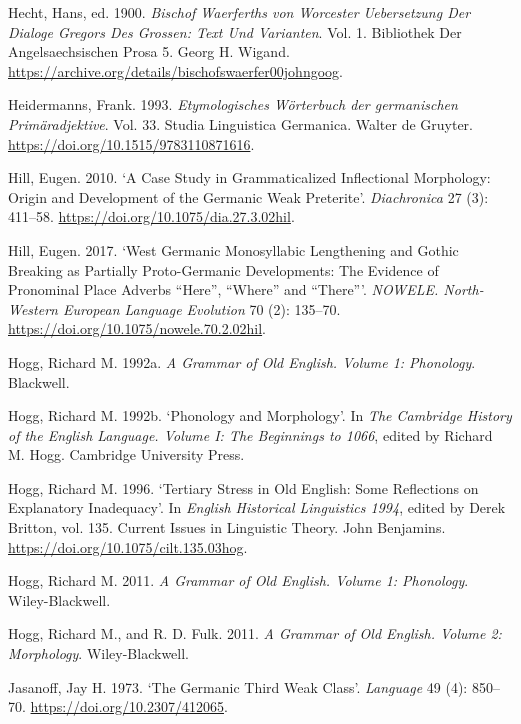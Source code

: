 \documentclass[
  british,
  a4paper,
]{article}
\newlength{\cslhangindent}
\newenvironment{CSLReferences}[2] %
 {\begin{list}{}{%
  \setlength{\itemindent}{0pt}
  \setlength{\leftmargin}{0pt}
  \setlength{\parsep}{0pt}
  \ifodd #1
   \setlength{\leftmargin}{\cslhangindent}
   \setlength{\itemindent}{-1\cslhangindent}
  \fi
  \setlength{\itemsep}{#2\baselineskip}}}
 {\end{list}}
\begin{document}
\begin{CSLReferences}{1}{1}
Hecht, Hans, ed. 1900. \emph{Bischof Waerferths von Worcester
{Uebersetzung} Der {Dialoge} {Gregors} Des {Grossen}: Text Und
Varianten}. Vol. 1. Bibliothek Der Angelsaechsischen Prosa 5. Georg H.
Wigand. \url{https://archive.org/details/bischofswaerfer00johngoog}.

Heidermanns, Frank. 1993. \emph{{Etymologisches Wörterbuch der
germanischen Primäradjektive}}. Vol. 33. Studia Linguistica Germanica.
Walter de Gruyter. \url{https://doi.org/10.1515/9783110871616}.

Hill, Eugen. 2010. {`A Case Study in Grammaticalized Inflectional
Morphology: Origin and Development of the {Germanic} Weak Preterite'}.
\emph{Diachronica} 27 (3): 411--58.
\url{https://doi.org/10.1075/dia.27.3.02hil}.

Hill, Eugen. 2017. {`{West Germanic} Monosyllabic Lengthening and
{Gothic} Breaking as Partially {Proto-Germanic} Developments: The
Evidence of Pronominal Place Adverbs {``Here''}, {``Where''} and
{``There''}'}. \emph{NOWELE. North-Western European Language Evolution}
70 (2): 135--70. \url{https://doi.org/10.1075/nowele.70.2.02hil}.

Hogg, Richard M. 1992a. \emph{A Grammar of Old {English}. Volume 1:
Phonology}. Blackwell.

Hogg, Richard M. 1992b. {`Phonology and Morphology'}. In \emph{The
{Cambridge} History of the {English} Language. Volume {I}: The
Beginnings to 1066}, edited by Richard M. Hogg. Cambridge University
Press.

Hogg, Richard M. 1996. {`Tertiary Stress in {Old English}: Some
Reflections on Explanatory Inadequacy'}. In \emph{{English Historical
Linguistics 1994}}, edited by Derek Britton, vol. 135. Current Issues in
Linguistic Theory. John Benjamins.
\url{https://doi.org/10.1075/cilt.135.03hog}.

Hogg, Richard M. 2011. \emph{A Grammar of Old {English}. Volume 1:
Phonology}. Wiley-Blackwell.

Hogg, Richard M., and R. D. Fulk. 2011. \emph{A Grammar of Old
{English}. Volume 2: Morphology}. Wiley-Blackwell.

Jasanoff, Jay H. 1973. {`The {Germanic} Third Weak Class'}.
\emph{Language} 49 (4): 850--70. \url{https://doi.org/10.2307/412065}.


\end{CSLReferences}
\end{document}
